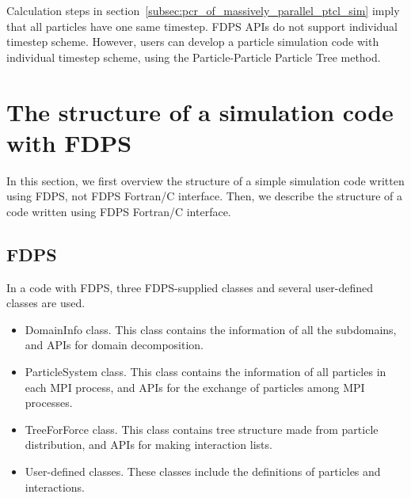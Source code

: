 Calculation steps in section~\ref{subsec:pcr_of_massively_parallel_ptcl_sim} imply that all particles have one same timestep. FDPS APIs do not support individual timestep scheme. However, users can develop a particle simulation code with individual timestep scheme, using the Particle-Particle Particle Tree method.

\section{The structure of a simulation code with FDPS}
\label{sec:overview_action}
In this section, we first overview the structure of a simple simulation code written using FDPS, not FDPS Fortran/C interface. Then, we describe the structure of a code written using FDPS Fortran/C interface.

\subsection{FDPS}
In a code with FDPS, three FDPS-supplied classes and several user-defined classes are used.
\begin{itemize}

\item DomainInfo class. This class contains the information of all the subdomains, and APIs for domain decomposition.

\item ParticleSystem class. This class contains the information of all particles in each MPI process, and APIs for the exchange of
  particles among MPI processes.

\item TreeForForce class. This class contains tree structure made from particle distribution, and APIs for making interaction lists.

\item User-defined classes. These classes include the definitions of particles and interactions.
\end{itemize}

